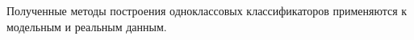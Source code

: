Полученные методы построения одноклассовых классификаторов применяются к модельным и реальным данным.






